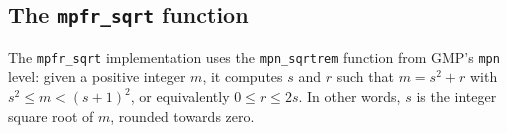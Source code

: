 \documentclass[12pt]{amsart}
\begin{document}
\begin{comment}
Let $u = u_n 2^{u_e}$, $v = v_n
2^{v_e}$, where $u_n$ and $v_n$ are in $[1/2, 1[$. Let $q_p$ be the
precision required on $q$. Put
$b_p = \min(v_p, q_p + \varepsilon_p)$,
$a_p = b_p + q_p + \varepsilon_p$, where $\varepsilon_p$ is a small value
to be chosen.

First, a integer division of $u_{hi} = \lfloor
u_n 2^{a_p} \rfloor$ by
$v_{hi} = \lfloor v_n 2^{b_p} \rfloor$
is performed. Write $u_{hi} = \tilde{q} v_{hi} + \tilde{r}$.

If this division is not a full one, to obtain the real value
of the quotient, if $\delta = max(u_p, v_p)$, we have to
divide $u_n 2^{q_p + \varepsilon_p + \delta}$ by
$v_n 2^{\delta}$.

In that case, $2^{q_p + \varepsilon_p + \delta} u_n = \tilde{q}v_n
2^{\delta} + \tilde{r} 2^{\delta - q_p - \varepsilon_p} + u_{lo} -
\tilde{q}v_{lo}$, with obvious notations.

A positive correction on $q$ has to come from the contribution of
$\tilde{r} 2^{\delta - q_p - \varepsilon_p} + u_{lo}$. The
first term is at most $v_{hi} 2^{\delta - q_p - \varepsilon_p}$.
As for $u_{lo}$, we have $u_{lo} < 2^{\delta-q_p-\varepsilon_p}$. Hence,
the sum $u_{lo} + \tilde{r} 2^{\delta - q_p - \varepsilon_p} < 2v$,
and the positive correction is at most 1.

We now have to estimate $\tilde{q}v_{lo}$. It is easily seen that
$\tilde{q} < 2^{q_p + \varepsilon_p + 1}$. As for $v_{lo}$, we have
$v_{lo} < 2^{\delta - q_p - \varepsilon_p}$, so that
$\tilde{q} v_{lo} < 2^{\delta + 1}$, to be compared with $v_n 2^{\delta}$,
so that a negative correction is at most 3. As a consequence, to be able
to decide rounding after the first stage, one should choose
$\varepsilon_p \geq 3$ (to include the round-to-nearest case).
\end{comment}

\subsection{The {\tt mpfr\_sqrt} function}

The \texttt{mpfr\_sqrt} implementation uses the \texttt{mpn\_sqrtrem}
function from GMP's \texttt{mpn} level:
given a positive integer $m$, it computes $s$ and $r$ such that
$m = s^2 + r$ with $s^2 \leq m < (s+1)^2$, or equivalently $0 \leq r \leq 2s$.
In other words, $s$ is the integer square root of $m$, rounded towards zero.
\end{document}
